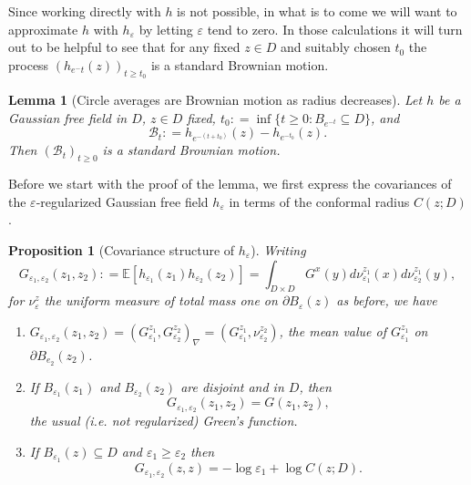 \documentclass[11pt,reqno]{amsart}
\numberwithin{equation}{section}
\newtheorem{lem}[thm]{Lemma}
\newtheorem{pro}[thm]{Proposition}
\newcommand{\deq}{\mathrel{\mathop:}=}
\newcommand{\eps}{\varepsilon}
\begin{document}
Since working directly with $h$ is not possible, in what is to come we will want to approximate $h$ with $h_\eps$ by letting $\eps$ tend to zero. In those calculations it will turn out to be helpful to see that for any fixed $z\in D$ and suitably chosen $t_0$ the process $(h_{e^-t}(z))_{t\geq t_0}$ is a standard Brownian motion.

\begin{lem}[Circle averages are Brownian motion as radius decreases]\label{lem:hepsIsBM}
	Let $h$ be a Gaussian free field in $D$, $z\in D$ fixed, $t_0\deq\inf\{t\geq 0: B_{e^{-t}}\subseteq D\}$, and $$\mathcal B_t\deq h_{e^{-(t+t_0)}}(z)-h_{e^{-t_0}}(z).$$
	Then $(\mathcal B_t)_{t\geq 0}$ is a standard Brownian motion.
\end{lem}

Before we start with the proof of the lemma, we first express the covariances of the $\eps$-regularized Gaussian free field $h_\eps$ in terms of the conformal radius $C(z;D)$.

\begin{pro}[Covariance structure of $h_\eps$]\label{prop:covariancesOfRegularizedH}
	Writing $$G_{\eps_1,\eps_2}(z_1,z_2) \deq \mathbb E[h_{\eps_1}(z_1)h_{\eps_2}(z_2)] = \int_{D\times D} G^x(y)d\nu_{\eps_1}^{z_1}(x)d\nu_{\eps_2}^{z_1}(y),$$ for $\nu_\eps^z$ the uniform measure of total mass one on $\partial B_\eps(z)$ as before, we have
	\begin{enumerate}
		\item $G_{\eps_1,\eps_2}(z_1,z_2) = (G_{\eps_1}^{z_1},G_{\eps_2}^{z_2})_\nabla = (G_{\eps_1}^{z_1},\nu_{\eps_2}^{z_2})$, the mean value of $G_{\eps_1}^{z_1}$ on $\partial B_{e_2}(z_2)$.
		\item If $B_{\eps_1}(z_1)$ and $B_{\eps_2}(z_2)$ are disjoint and in $D$, then $$G_{\eps_1,\eps_2}(z_1,z_2) = G(z_1,z_2),$$ the usual (i.e. not regularized) Green's function.
		\item\label{item:covarianceForSameZdifferentEps} If $B_{\eps_1}(z)\subseteq D$ and $\eps_1\geq\eps_2$ then $$G_{\eps_1,\eps_2}(z,z)=-\log\eps_1+\log C(z;D).$$
	\end{enumerate}
\end{pro}
\end{document}
